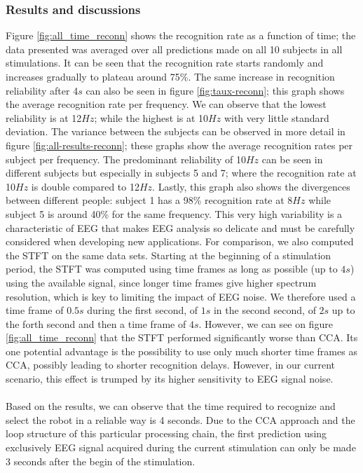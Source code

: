 \documentclass[smallextended]{svjour3}
\begin{document}
\subsubsection{Results and discussions}
Figure \ref{fig:all_time_reconn} shows the recognition rate as a function of time; the data presented was averaged over all predictions made on all 10 subjects in all stimulations.
It can be seen that the recognition rate starts randomly and increases gradually to plateau around 75\%.
The same increase in recognition reliability after 4$s$ can also be seen in figure \ref{fig:taux-reconn}; this graph shows the average recognition rate per frequency.
We can observe that the lowest reliability is at 12$Hz$; while the highest is at 10$Hz$ with very little standard deviation.
The variance between the subjects can be observed in more detail in figure \ref{fig:all-results-reconn}; these graphs show the average recognition rates per subject per frequency.
The predominant reliability of 10$Hz$ can be seen in different subjects but especially in subjects 5 and 7; where the recognition rate at 10$Hz$ is double compared to 12$Hz$.
Lastly, this graph also shows the divergences between different people: subject 1 has a 98\% recognition rate at 8$Hz$ while subject 5 is around 40\% for the same frequency.
This very high variability is a characteristic of EEG that makes EEG analysis so delicate and must be carefully considered when developing new applications.
For comparison, we also computed the STFT on the same data sets.
Starting at the beginning of a stimulation period, the STFT was computed using time frames as long as possible (up to $4s$) using the available signal, since longer time frames give higher spectrum resolution, which is key to limiting the impact of EEG noise.
We therefore used a time frame of $0.5s$ during the first second, of $1s$ in the second second, of $2s$ up to the forth second and then a time frame of $4s$.
However, we can see on figure \ref{fig:all_time_reconn} that the STFT performed significantly worse than CCA.
Its one potential advantage is the possibility to use only much shorter time frames as CCA,
possibly leading to shorter recognition delays.
However, in our current scenario, this effect is trumped by its higher sensitivity to EEG signal noise.\\
\\
Based on the results, we can observe that the time required to recognize and select the robot in a reliable way is 4 seconds. 
Due to the CCA approach and the loop structure of this particular processing chain, the first prediction using exclusively EEG signal acquired during the current stimulation can only be made 3 seconds after the begin of the stimulation.
\end{document}
